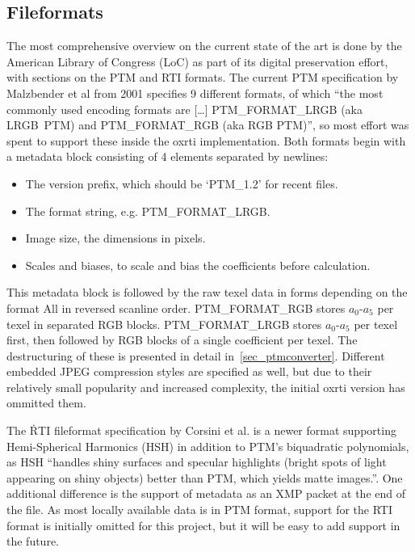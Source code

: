 \subsection{Fileformats}\label{sec_relfile}
The most comprehensive overview on the current state of the art is done by the
American Library of Congress (LoC) as part of its digital preservation effort, with
sections on the PTM\cite{library_of_congress_polynomial_2018} and
RTI\cite{library_of_congress_reflectance_2018} formats. The current PTM
specification by Malzbender et al\cite*{malzbender_polynomial_2001} from 2001 specifies 9
different formats, of which ``the most commonly used encoding formats are
[\ldots] PTM\_FORMAT\_LRGB (aka LRGB\ PTM) and
PTM\_FORMAT\_RGB (aka RGB PTM)''\cite{library_of_congress_polynomial_2018}, so most effort was
spent to support these inside the oxrti implementation. Both formats begin with
a metadata block consisting of 4 elements separated by newlines:
\begin{itemize}
\item The version prefix, which should be `PTM\_1.2' for recent files.
\item The format string, e.g. PTM\_FORMAT\_LRGB.
\item Image size, the dimensions in pixels.
\item Scales and biases, to scale and bias the coefficients before calculation.
\end{itemize}
This metadata block is followed by the raw texel data in forms depending on the
format All in reversed scanline order. PTM\_FORMAT\_RGB stores $a_{0}$-$a_{5}$ per
texel in separated RGB blocks. PTM\_FORMAT\_LRGB stores $a_{0}$-$a_{5}$ per texel
first, then followed by RGB blocks of a single coefficient per texel. The
destructuring of these is presented in detail in~\autoref{sec_ptmconverter}. Different
embedded JPEG compression styles are specified as well, but due to their
relatively small popularity and increased complexity, the initial oxrti version
has ommitted them.

The \.RTI fileformat specification by Corsini et al.\cite*{corsini_rti_2010} is a
newer format supporting Hemi-Spherical Harmonics (HSH) in addition to PTM's
biquadratic polynomials, as HSH ``handles shiny surfaces and specular
highlights (bright spots of light appearing on shiny objects) better than PTM,
which yields matte images.''\cite*{library_of_congress_reflectance_2018}. One
additional difference is the support of metadata as an XMP packet at the end of
the file. As most locally available data is in PTM format, support for the RTI
format is initially omitted for this project, but it will be easy to add support
in the future.

